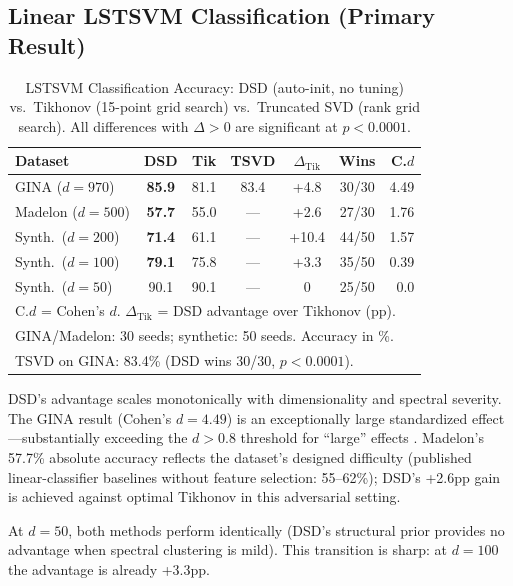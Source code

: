 \documentclass[journal]{IEEEtran}
\begin{document}
\subsection{Linear LSTSVM Classification (Primary Result)}

\begin{table}[!t]
\centering
\caption{LSTSVM Classification Accuracy: DSD (auto-init, no tuning) vs.\ Tikhonov (15-point grid search) vs.\ Truncated SVD (rank grid search). All differences with $\Delta > 0$ are significant at $p < 0.0001$.}
\label{tab:lstsvm_results}
\small
\begin{tabular}{@{}lcccccr@{}}
\toprule
\textbf{Dataset} & \textbf{DSD} & \textbf{Tik} & \textbf{TSVD} & \textbf{$\Delta_{\text{Tik}}$} & \textbf{Wins} & \textbf{C.$d$} \\
\midrule
GINA ($d{=}970$) & \textbf{85.9} & 81.1 & 83.4 & +4.8 & 30/30 & 4.49 \\
Madelon ($d{=}500$) & \textbf{57.7} & 55.0 & --- & +2.6 & 27/30 & 1.76 \\
Synth.\ ($d{=}200$) & \textbf{71.4} & 61.1 & --- & +10.4 & 44/50 & 1.57 \\
Synth.\ ($d{=}100$) & \textbf{79.1} & 75.8 & --- & +3.3 & 35/50 & 0.39 \\
Synth.\ ($d{=}50$) & 90.1 & 90.1 & --- & 0 & 25/50 & 0.0 \\
\bottomrule
\multicolumn{7}{l}{\scriptsize C.$d$ = Cohen's $d$. $\Delta_{\text{Tik}}$ = DSD advantage over Tikhonov (pp).}\\
\multicolumn{7}{l}{\scriptsize GINA/Madelon: 30 seeds; synthetic: 50 seeds. Accuracy in \%.}\\
\multicolumn{7}{l}{\scriptsize TSVD on GINA: 83.4\% (DSD wins 30/30, $p < 0.0001$).}
\end{tabular}
\end{table}

DSD's advantage scales monotonically with dimensionality and spectral severity. The GINA result (Cohen's $d = 4.49$) is an exceptionally large standardized effect---substantially exceeding the $d > 0.8$ threshold for ``large'' effects \cite{cohen1988statistical}. Madelon's 57.7\% absolute accuracy reflects the dataset's designed difficulty (published linear-classifier baselines without feature selection: 55--62\%); DSD's +2.6pp gain is achieved against optimal Tikhonov in this adversarial setting.

At $d{=}50$, both methods perform identically (DSD's structural prior provides no advantage when spectral clustering is mild). This transition is sharp: at $d{=}100$ the advantage is already +3.3pp.
\end{document}

